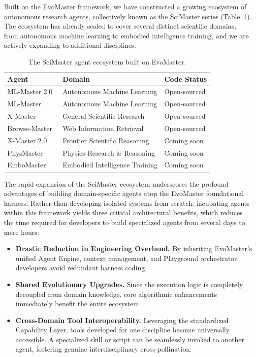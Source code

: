 \documentclass[11pt, a4paper, logo, copyright, nonumbering]{cls/Sci}
\begin{document}
Built on the EvoMaster framework, we have constructed a growing ecosystem of autonomous research agents, collectively known as the SciMaster series (Table~\ref{tab:scimaster}). The ecosystem has already scaled to cover several distinct scientific domains, from autonomous machine learning to embodied intelligence training, and we are actively expanding to additional disciplines. 

\begin{table}[h]
\centering
\caption{The SciMaster agent ecosystem built on EvoMaster.}
\label{tab:scimaster}
\begin{tabular}{lll}
\toprule
\textbf{Agent} & \textbf{Domain} & \textbf{Code Status} \\
\midrule
ML-Master 2.0~\citep{sjtu2026mlmaster2} & Autonomous Machine Learning & Open-sourced \\
ML-Master~\citep{sjtu2025mlmaster} & Autonomous Machine Learning & Open-sourced \\
X-Master~\citep{sjtu2025xmaster} & General Scientific Research & Open-sourced \\
Browse-Master~\citep{sjtu2025browsemaster} & Web Information Retrieval & Open-sourced \\
X-Master 2.0 & Frontier Scientific Reasoning & Coming soon \\
PhysMaster~\citep{sjtu2025physmaster} & Physics Research \& Reasoning & Coming soon \\
EmboMaster~\citep{sjtu2026embomaster} & Embodied Intelligence Training & Coming soon \\
\bottomrule
\end{tabular}
\end{table}

The rapid expansion of the SciMaster ecosystem underscores the profound advantages of building domain-specific agents atop the EvoMaster foundational harness. Rather than developing isolated systems from scratch, incubating agents within this framework yields three critical architectural benefits, which reduces the time required for developers to build specialized agents from several days to mere hours:

\begin{itemize}[leftmargin=*, nosep]
    \item \textbf{Drastic Reduction in Engineering Overhead.} By inheriting EvoMaster's unified Agent Engine, context management, and Playground orchestrator, developers avoid redundant harness coding. 
    \item \textbf{Shared Evolutionary Upgrades.} Since the execution logic is completely decoupled from domain knowledge, core algorithmic enhancements immediately benefit the entire ecosystem. 
    \item \textbf{Cross-Domain Tool Interoperability.} Leveraging the standardized Capability Layer, tools developed for one discipline become universally accessible. A specialized skill or script can be seamlessly invoked to another agent, fostering genuine interdisciplinary cross-pollination.
\end{itemize}
\end{document}
